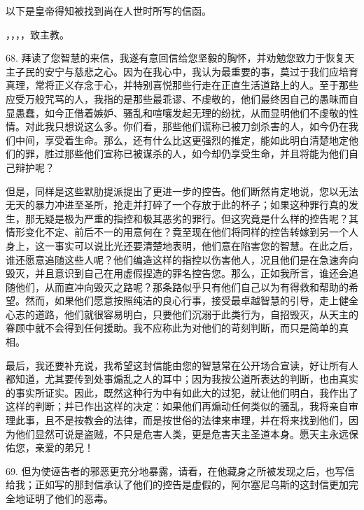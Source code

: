 以下是皇帝得知被找到尚在人世时所写的信函。\par

，，，，致主教。\par

68. 拜读了您智慧的来信，我遂有意回信给您坚毅的胸怀，并劝勉您致力于恢复天主子民的安宁与慈悲之心。因为在我心中，我认为最重要的事，莫过于我们应培育真理，常将正义存念于心，并特别喜悦那些行走在正直生活道路上的人。至于那些应受万般咒骂的人，我指的是那些最乖谬、不虔敬的，他们最终因自己的愚昧而自显愚蠢，如今正借着嫉妒、骚乱和喧嚷发起无理的纷扰，从而显明他们不虔敬的性情。对此我只想说这么多。你们看，那些他们谎称已被刀剑杀害的人，如今仍在我们中间，享受着生命。那么，还有什么比这更强烈的推定，能如此明白清楚地定他们的罪，胜过那些他们宣称已被谋杀的人，如今却仍享受生命，并且将能为他们自己辩护呢？\par

但是，同样是这些默肋提派提出了更进一步的控告。他们断然肯定地说，您以无法无天的暴力冲进至圣所，抢走并打碎了一个存放于此的杯子；如果这种罪行真的发生，那无疑是极为严重的指控和极其恶劣的罪行。但这究竟是什么样的控告呢？其情形变化不定、前后不一的用意何在？竟至现在他们将同样的控告转嫁到另一个人身上，这一事实可以说比光还要清楚地表明，他们意在陷害您的智慧。在此之后，谁还愿意追随这些人呢？他们编造这样的指控以伤害他人，况且他们是在急速奔向毁灭，并且意识到自己在用虚假捏造的罪名控告您。那么，正如我所言，谁还会追随他们，从而直冲向毁灭之路呢？那条路似乎只有他们自己以为有得救和帮助的希望。然而，如果他们愿意按照纯洁的良心行事，接受最卓越智慧的引导，走上健全心志的道路，他们就很容易明白，只要他们沉溺于此类行为，自招毁灭，从天主的眷顾中就不会得到任何援助。我不应称此为对他们的苛刻判断，而只是简单的真相。\par

最后，我还要补充说，我希望这封信能由您的智慧常在公开场合宣读，好让所有人都知道，尤其要传到处事煽乱之人的耳中；因为我按公道所表达的判断，也由真实的事实所证实。因此，既然这种行为中有如此大的过犯，就让他们明白，我作出了这样的判断；并已作出这样的决定：如果他们再煽动任何类似的骚乱，我将亲自审理此事，且不是按教会的法律，而是按世俗的法律来审理，并在将来找到他们，因为他们显然可说是盗贼，不只是危害人类，更是危害天主圣道本身。愿天主永远保佑您，亲爱的弟兄！\par

69. 但为使诬告者的邪恶更充分地暴露，请看，在他藏身之所被发现之后，也写信给我；正如写的那封信承认了他们的控告是虚假的，阿尔塞尼乌斯的这封信更加完全地证明了他们的恶毒。\par

